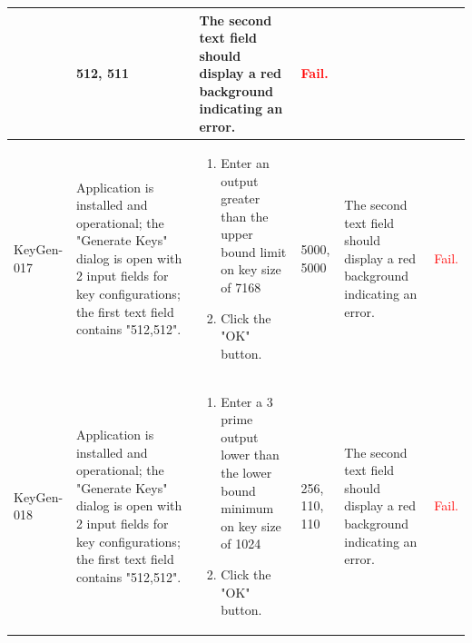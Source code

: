 \documentclass[]{final_report}
\theoremstyle{definition}
\begin{document}
\begin{longtable}{|p{1.5cm}|p{2.5cm}|p{3.5cm}|p{2.5cm}|p{3cm}|p{2cm}|}
\begin{enumerate}
  \end{enumerate} & 512, 511 & The second text field should display a red background indicating an error. & \textcolor{red}{Fail.} \\
  \hline
    \hline
    KeyGen-017 & Application is installed and operational; the "Generate Keys" dialog is open with 2 input fields for key configurations; the first text field contains "512,512". & 
  \begin{enumerate}
  \item Enter an output greater than the upper bound limit on key size of 7168
  \item Click the "OK" button.
  \end{enumerate} & 5000, 5000 & The second text field should display a red background indicating an error. & \textcolor{red}{Fail.} \\
  \hline
    KeyGen-018 & Application is installed and operational; the "Generate Keys" dialog is open with 2 input fields for key configurations; the first text field contains "512,512". & 
  \begin{enumerate}
  \item Enter a 3 prime output lower than the lower bound minimum on key size of 1024
  \item Click the "OK" button.
  \end{enumerate} & 256, 110, 110 & The second text field should display a red background indicating an error. & \textcolor{red}{Fail.} \\
  \hline
\end{longtable}
\end{document}
